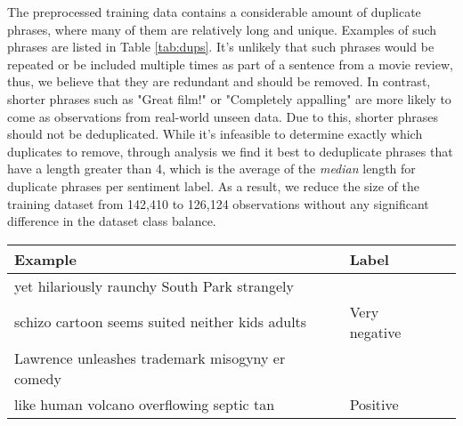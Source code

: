 \documentclass{article}
\begin{document}
The preprocessed training data contains a considerable amount of duplicate phrases, where many of them are relatively long and unique. Examples of such phrases are listed in Table \ref{tab:dups}. It's unlikely that such phrases would be repeated or be included multiple times as part of a sentence from a movie review, thus, we believe that they are redundant and should be removed. In contrast, shorter phrases such as "Great film!" or "Completely appalling" are more likely to come as observations from real-world unseen data. Due to this, shorter phrases should not be deduplicated. While it's infeasible to determine exactly which duplicates to remove, through analysis we find it best to deduplicate phrases that have a length greater than 4, which is the average of the \emph{median} length for duplicate phrases per sentiment label. As a result, we reduce the size of the training dataset from 142,410 to 126,124 observations without any significant difference in the dataset class balance. 

\begin{table*}[h]
\caption{Examples of duplicated phrases.}
\label{tab:dups}
\centering 
\small
\begin{tabularx}{0.9\textwidth}{l p{4.5cm} X}
    \toprule
    Example & Label \\ 
    \midrule 
    yet hilariously raunchy South Park strangely  \\ 
    schizo cartoon seems suited neither kids adults  & Very negative \\ 
    Lawrence unleashes trademark misogyny er comedy \\ 
    like human volcano overflowing septic tan & Positive \\ 
    \bottomrule
\end{tabularx}
\end{table*}
\end{document}

